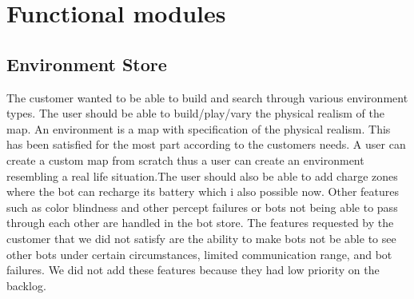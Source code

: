 \section{Functional modules}

\subsection*{Environment Store}
The customer wanted to be able to build and search through various environment types. The user should be able to build/play/vary the physical realism of the map. An environment is a map with specification of the physical realism. This has been satisfied for the most part according to the customers needs. A user can create a custom map from scratch thus a user can create an environment resembling a real life situation.The user should also be able to add charge zones where the bot can recharge its battery which i also possible now. Other features such as color blindness and other percept failures or bots not being able to pass through each other are handled in the bot store. The features requested by the customer that we did not satisfy are the ability to make bots not be able to see other bots under certain circumstances, limited communication range, and bot failures. We did not add these features because they had low priority on the backlog.

